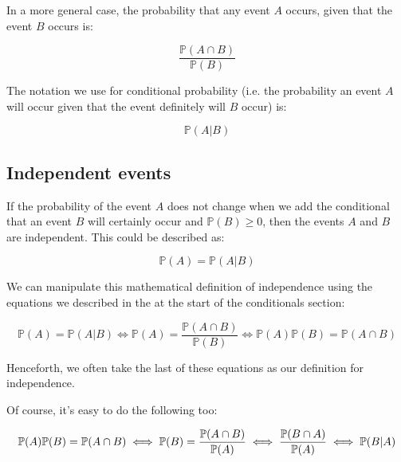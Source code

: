 In a more general case, the probability that any event $A$ occurs, given that
the event $B$ occurs is:

\begin{dmath}
	\frac{\mathbb{P}(A \cap B)}{\mathbb{P}(B)}
\end{dmath}

The notation we use for conditional probability (i.e. the probability an event
$A$ will occur given that the event definitely will $B$ occur) is:

\begin{dmath}
	\mathbb{P}(A|B)
\end{dmath}


\subsection{Independent events}

If the probability of the event $A$ does not change when we add the conditional
that an event $B$ will certainly occur and $\mathbb{P}(B) \ge 0$, then the
events $A$ and $B$ are independent. This could be described as:

\begin{dmath}
	{\mathbb{P}(A) = \mathbb{P}(A|B)}
\end{dmath}

We can manipulate this mathematical definition of independence using the
equations we described in the at the start of the conditionals section:

\begin{dmath}
	{\mathbb{P}(A) = \mathbb{P}(A|B)} \iff {\mathbb{P}(A) = \frac{\mathbb{P}(A \cap B)}{\mathbb{P}(B)}} \iff {\mathbb{P}(A)\mathbb{P}(B) = \mathbb{P}(A \cap B)}
\end{dmath}

Henceforth, we often take the last of these equations as our definition for
independence.

Of course, it's easy to do the following too:

\begin{dmath}
	{\mathbb{P}(A)\mathbb{P}(B) = \mathbb{P}(A \cap B)} \iff {\mathbb{P}(B) = \frac{\mathbb{P}(A \cap B)}{\mathbb{P}(A)}} \iff {\frac{\mathbb{P}(B \cap A)}{\mathbb{P}(A)}} \iff {\mathbb{P}(B|A)}\\	
\end{dmath}

